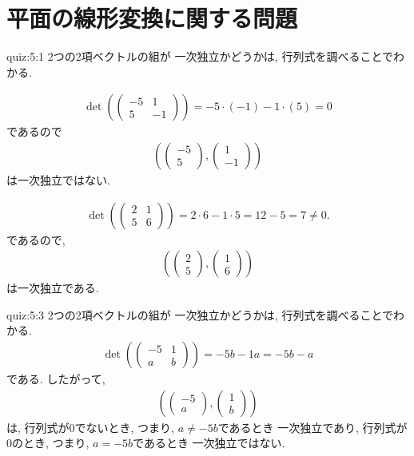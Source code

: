 \section{平面の線形変換に関する問題}
\begin{answerof}{quiz:5:1}
  2つの2項ベクトルの組が
  一次独立かどうかは, 行列式を調べることでわかる.
  
 \begin{align*}
     \det(\begin{pmatrix}-5&1\\5&-1\end{pmatrix})=-5\cdot(-1)-1\cdot(5)=0
 \end{align*}
 であるので
 \begin{align*}
   (\begin{pmatrix}-5\\5\end{pmatrix},\begin{pmatrix}1\\-1\end{pmatrix})
 \end{align*}
 は一次独立ではない.

 \begin{align*}
    \det(\begin{pmatrix}
      2&1\\5&6
    \end{pmatrix})=2\cdot 6 -1\cdot 5=12-5=7\neq 0.
 \end{align*}
 であるので,
 \begin{align*}
   (\begin{pmatrix}2\\5\end{pmatrix},\begin{pmatrix}1\\6\end{pmatrix})
 \end{align*}
は一次独立である.
\end{answerof}


\begin{answerof}{quiz:5:3}  
  2つの2項ベクトルの組が
  一次独立かどうかは, 行列式を調べることでわかる.
  \begin{align*}
    \det(\begin{pmatrix}-5&1\\a&b\end{pmatrix})
    =-5b-1a=-5b-a
  \end{align*}
  である.
  したがって,
  \begin{align*}
    (\begin{pmatrix}-5\\a\end{pmatrix},
    \begin{pmatrix}1\\b\end{pmatrix})
  \end{align*}
  は,
  行列式が$0$でないとき,
  つまり,
  $a\neq -5b$であるとき
  一次独立であり,
  行列式が$0$のとき,
  つまり,
  $a= -5b$であるとき
  一次独立ではない.
\end{answerof}


